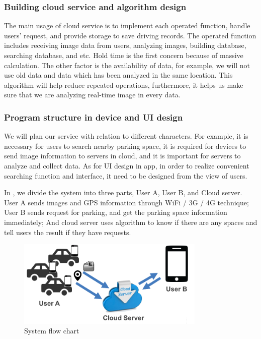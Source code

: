 \documentclass[journal,article,submit,moreauthors,pdftex,10pt,a4paper]{mdpi}
\begin{document}
%
\subsubsection{Building cloud service and algorithm design}
%

The main usage of cloud service is to implement each operated function,
handle users' request, and provide storage to save driving records. The
operated function includes receiving image data from users, analyzing
images, building database, searching database, and etc. Hold time is the
first concern because of massive calculation. The other factor is the
availability of data, for example, we will not use old data and data
which has been analyzed in the same location. This algorithm will help
reduce repeated operations, furthermore, it helps us make sure that we
are analyzing real-time image in every data.

%
\subsubsection{Program structure in device and UI design}
%

We will plan our service with relation to different characters. For
example, it is necessary for users to search nearby parking space, it is
required for devices to send image information to servers in cloud, and it
is important for servers to analyze and collect data. As for UI design
in app, in order to realize convenient searching function and interface,
it need to be designed from the view of users.

In , we divide the system into three parts, User A, User B, and Cloud server.
User A sends images and GPS information through WiFi / 3G / 4G technique;
User B sends request for parking, and get the parking space information
immediately; And cloud server uses algorithm to know if there are any
spaces and tell users the result if they have requests.

\begin{figure}[tbp]
	\centering
		\includegraphics[width=0.8\textwidth,natwidth=1053,natheight=482]{Figures/flowChart.png}
		\caption{System flow chart}
		\label{fig:system}
\end{figure}
\end{document}
